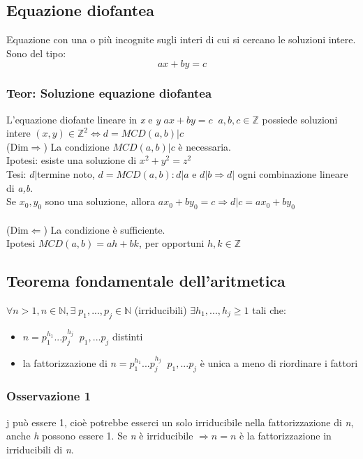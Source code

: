 \subsection{Equazione diofantea}
Equazione con una o più incognite sugli interi di cui si cercano le soluzioni intere. Sono del tipo:
\[ax+by=c\]

\subsubsection{Teor: Soluzione equazione diofantea}
L'equazione diofante lineare in \textit{x} e \textit{y} \(ax+by=c\;\; a,b,c\in\mathbb{Z}\) possiede soluzioni intere \((x,y)\in\mathbb{Z}^2\Leftrightarrow d=MCD(a,b)|c\)
\\
(Dim\(\Rightarrow\)) La condizione \(MCD(a,b)|c\) è necessaria.
\\
Ipotesi: esiste una soluzione di \(x^2+y^2=z^2\)
\\
Tesi: \(d|\)termine noto, \(d=MCD(a,b): d|a\) e \(d|b\Rightarrow d|\) ogni combinazione lineare di \textit{a,b}.
\\
Se \(x_0,y_0\) sono una soluzione, allora \(ax_0+by_0=c\Rightarrow d|c=ax_0+by_0\)
\\\\
(Dim\(\Leftarrow\)) La condizione è sufficiente.
\\
Ipotesi \(MCD(a,b)=ah+bk\), per opportuni \(h,k\in\mathbb{Z}\)

\subsection{Teorema fondamentale dell'aritmetica}
\(\forall n>1, n\in\mathbb{N},\exists\;p_1,...,p_j\in\mathbb{N}\) (irriducibili) \(\exists h_1,...,h_j\geq 1\) tali che:
\begin{itemize}
    \item \(n=p_1^{h_1}...p_j^{h_j}\;\;p_1,...p_j\) distinti
    \item la fattorizzazione di \(n=p_1^{h_1}...p_j^{h_j}\;\;p_1,...p_j\) è unica a meno di riordinare i fattori
\end{itemize}

\subsubsection{Osservazione 1}
j può essere 1, cioè potrebbe esserci un solo irriducibile nella fattorizzazione di \textit{n}, anche \textit{h} possono essere 1.
Se \textit{n} è irriducibile \(\Rightarrow n=n\) è la fattorizzazione in irriducibili di \textit{n}.

